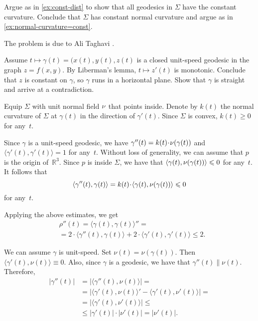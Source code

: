 \begin{multicols}{2}
Argue as in \ref{ex:const-dist} to show that all geodesics in $\Sigma$ have the constant curvature.
Conclude that $\Sigma$ has constant normal curvature and argue as in \ref{ex:normal-curvature=const}.

 The problem is due to Ali Taghavi \cite{taghavi}.

 Assume $t\mapsto \gamma(t)=(x(t),y(t),z(t)$ is a closed unit-speed geodesic in the graph $z=f(x,y)$.
By Liberman's lemma, $t\mapsto z'(t)$ is monotonic.
Conclude that $z$ is constant on $\gamma$, so $\gamma$ runs in a horizontal plane.
Show that $\gamma$ is straight and arrive at a contradiction.

Equip $\Sigma$ with unit normal field $\nu$ that points inside.
Denote by $k(t)$ the normal curvature of $\Sigma$ at $\gamma(t)$ in the direction of $\gamma'(t)$.
Since $\Sigma$ is convex, $k(t)\ge 0$ for any~$t$.

Since $\gamma$ is a unit-speed geodesic, we have $\gamma''(t)=k(t)\cdot\Norm(\gamma(t))$ and $\langle\gamma'(t),\gamma'(t)\rangle=1$ for any~$t$.
Without loss of generality, we can assume that $p$ is the origin of~$\mathbb{R}^3$.
Since $p$ is inside $\Sigma$, we have that $\langle\gamma(t),\nu(\gamma(t))\rangle\leqslant 0$ for any~$t$.
It follows that 
\[\langle\gamma''(t),\gamma(t)\rangle=k(t)\cdot \langle\gamma(t),\Norm(\gamma(t))\rangle\le 0\]
for any~$t$.

Applying the above estimates, we get 
\begin{align*}
&\rho''(t)
=\langle\gamma(t),\gamma(t)\rangle''=
\\
&=2\cdot\langle\gamma''(t),\gamma(t)\rangle+2\cdot\langle\gamma'(t),\gamma'(t)\rangle\le 2.
\end{align*}


We can assume $\gamma$ is unit-speed.
Set $\nu (t) = \nu ( \gamma (t)) $. 
Then $\langle \gamma'(t) , \nu (t) \rangle \equiv 0$. Also, since $\gamma$ is a geodesic, we have that $\gamma''(t) \parallel \nu (t)$.
Therefore,
\[
\begin{aligned}
|\gamma''(t)|
&=|\langle\gamma''(t),\nu(t)\rangle|=
\\
&=|\langle\gamma'(t),\nu(t)\rangle'-\langle\gamma'(t),\nu'(t)\rangle|=
\\
&=|\langle\gamma'(t),\nu'(t)\rangle|\le
\\
&\le|\gamma'(t)|\cdot|\nu'(t)|=|\nu'(t)|.
\end{aligned}
\]


\end{multicols}
